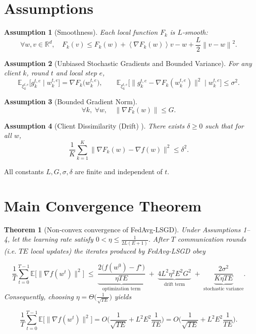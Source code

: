 \documentclass{article}
\newtheorem{theorem}{Theorem}
\newtheorem{assumption}{Assumption}
\newcommand{\E}{\mathbb{E}}
\newcommand{\norm}[1]{\left\|#1\right\|}
\newcommand{\inner}[1]{\left\langle#1\right\rangle}
\begin{document}
\section*{Assumptions}
\begin{assumption}[Smoothness]
Each local function $F_k$ is $L$‑smooth:
\[
\forall w,v\in\mathbb{R}^{d},\quad
F_k(v)\le F_k(w)+\inner{\nabla F_k(w)}{v-w}+\frac{L}{2}\norm{v-w}^{2}.
\] 
\end{assumption}
\begin{assumption}[Unbiased Stochastic Gradients and Bounded Variance]
For any client $k$, round $t$ and local step $e$,
\[
\E_{\xi^{t,e}_{k}}\!\big[g^{t,e}_{k}\mid w^{t,e}_{k}\big]=\nabla F_k\big(w^{t,e}_{k}\big),\qquad
\E_{\xi^{t,e}_{k}}\!\big[\|g^{t,e}_{k}-\nabla F_k(w^{t,e}_{k})\|^{2}\mid w^{t,e}_{k}\big]\le\sigma^{2}.
\]
\end{assumption}
\begin{assumption}[Bounded Gradient Norm]
\[
\forall k,\; \forall w,\quad \|\nabla F_k(w)\|\le G.
\]
\end{assumption}
\begin{assumption}[Client Dissimilarity (Drift) \cite{li2020federated}]
There exists $\delta\ge0$ such that for all $w$,
\[
\frac{1}{K}\sum_{k=1}^{K}\|\nabla F_k(w)-\nabla f(w)\|^{2}\le\delta^{2}.
\]
\end{assumption}
All constants $L,G,\sigma,\delta$ are finite and independent of $t$.

\section*{Main Convergence Theorem}
\begin{theorem}[Non‑convex convergence of FedAvg‑LSGD]\label{thm:main}
Under Assumptions 1–4, let the learning rate satisfy $0<\eta\le\frac{1}{2L(E+1)}$. After $T$ communication rounds (i.e. $TE$ local updates) the iterates produced by FedAvg‑LSGD obey  

\[
\frac{1}{T}\sum_{t=0}^{T-1}\E\!\big[\|\nabla f(w^{t})\|^{2}\big]
\;\le\;
\underbrace{\frac{2\big(f(w^{0})-f^{\star}\big)}{\eta TE}}_{\text{optimization term}}
\;+\;
\underbrace{4L^{2}\eta^{2}E^{2}G^{2}}_{\text{drift term}}
\;+\;
\underbrace{\frac{2\sigma^{2}}{K\eta TE}}_{\text{stochastic variance}} .
\]
Consequently, choosing $\eta = \Theta\!\big(\frac{1}{\sqrt{TE}}\big)$ yields  

\[
\frac{1}{T}\sum_{t=0}^{T-1}\E\!\big[\|\nabla f(w^{t})\|^{2}\big]
= O\!\Big(\frac{1}{\sqrt{TE}}+L^{2}E^{2}\frac{1}{TE}\Big)
= O\!\Big(\frac{1}{\sqrt{TE}}+L^{2}E^{2}\frac{1}{TE}\Big).
\]
\end{theorem}
\end{document}
